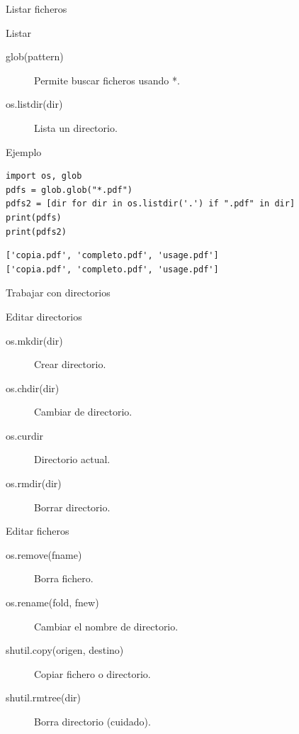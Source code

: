\documentclass[bigger,unknownkeysallowed]{beamer}
\begin{document}
\begin{frame}[fragile,label={sec:org2d5e356}]{Listar ficheros}
 \begin{block}{Listar}
\begin{description}
\item[{glob(pattern)}] Permite buscar ficheros usando *.

\item[{os.listdir(dir)}] Lista un directorio.
\end{description}
\end{block}

\begin{exampleblock}{Ejemplo}
\begin{verbatim}
import os, glob
pdfs = glob.glob("*.pdf")
pdfs2 = [dir for dir in os.listdir('.') if ".pdf" in dir]
print(pdfs)
print(pdfs2)
\end{verbatim}
\scriptsize
\begin{verbatim}
['copia.pdf', 'completo.pdf', 'usage.pdf']
['copia.pdf', 'completo.pdf', 'usage.pdf']
\end{verbatim}
\end{exampleblock}
\end{frame}

\begin{frame}[label={sec:orge52fffb}]{Trabajar con directorios}
\begin{block}{Editar directorios}
\begin{description}
\item[{os.mkdir(dir)}] Crear directorio.
\item[{os.chdir(dir)}] Cambiar de directorio.
\item[{os.curdir}] Directorio actual.
\item[{os.rmdir(dir)}] Borrar directorio.
\end{description}
\end{block}

\begin{block}{Editar ficheros}
\begin{description}
\item[{os.remove(fname)}] Borra fichero.
\item[{os.rename(fold, fnew)}] Cambiar el nombre de directorio.
\item[{shutil.copy(origen, destino)}] Copiar fichero o directorio.
\item[{shutil.rmtree(dir)}] Borra directorio (cuidado).
\end{description}
\end{block}
\end{frame}
\end{document}
